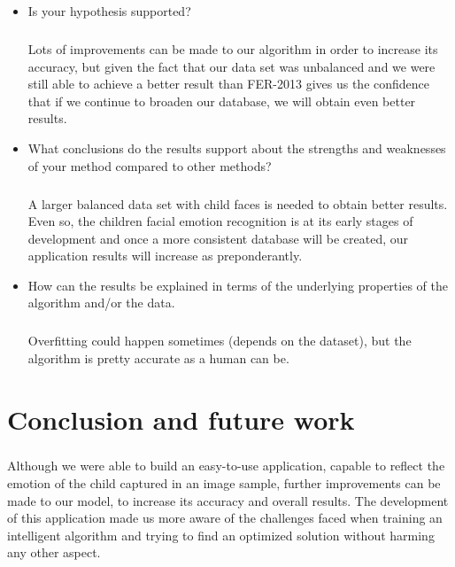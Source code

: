 \documentclass[runningheads,a4paper,11pt]{report}
\begin{document}
\begin{itemize}
	\item Is your hypothesis supported?
  \paragraph{}
  Lots of improvements can be made to our algorithm in order to increase its accuracy, but given the fact that our data set was unbalanced and we were still able to achieve a better result than FER-2013 gives us the confidence that if we continue to broaden our database, we will obtain even better results.
	\item What conclusions do the results support about the strengths and weaknesses of your method compared to other methods?
  \paragraph{}
  A larger balanced data set with child faces is needed to obtain better results. Even so, the children facial emotion recognition is at its early stages of development and once a more consistent database will be created, our application results will increase as preponderantly.
	\item How can the results be explained in terms of the underlying properties of the algorithm and/or the data.
  \paragraph{}
  Overfitting could happen sometimes (depends on the dataset), but the algorithm is pretty accurate as a human can be.
\end{itemize}

\chapter{Conclusion and future work}
\label{chapter:concl}
\paragraph{}
Although we were able to build an easy-to-use application, capable to reflect the emotion of the child captured in an image sample, further improvements can be made to our model, to increase its accuracy and overall results. The development of this application made us more aware of the challenges faced when training an intelligent algorithm and trying to find an optimized solution without harming any other aspect.
\end{document}
